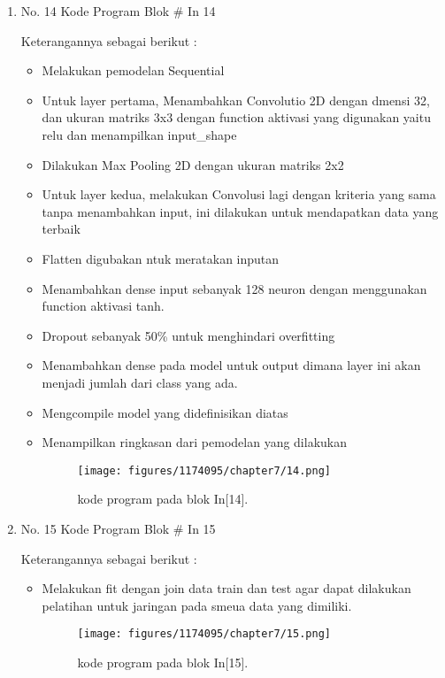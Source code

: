 \begin{enumerate}
\item No. 14 Kode Program Blok \# In 14
\par 
Keterangannya sebagai berikut :
\begin{itemize}
\item Melakukan pemodelan Sequential
\item Untuk layer pertama, Menambahkan Convolutio 2D dengan dmensi 32, dan ukuran matriks 3x3 dengan function aktivasi yang digunakan yaitu relu dan menampilkan input\_shape
\item Dilakukan Max Pooling 2D dengan ukuran matriks 2x2
\item Untuk layer kedua, melakukan Convolusi lagi dengan kriteria yang sama tanpa menambahkan input, ini dilakukan untuk mendapatkan data yang terbaik
\item Flatten digubakan ntuk meratakan inputan
\item Menambahkan dense input sebanyak 128 neuron dengan menggunakan function aktivasi tanh.
\item Dropout sebanyak 50\% untuk menghindari overfitting
\item Menambahkan dense pada model untuk output dimana layer ini akan menjadi jumlah dari class yang ada.
\item Mengcompile model yang didefinisikan diatas
\item Menampilkan ringkasan dari pemodelan yang dilakukan
\begin{figure}[H]
    \texttt{[image: figures/1174095/chapter7/14.png]}
    \centering
    \caption{kode program pada blok  In[14].}
    \end{figure}
\end{itemize}

\item No. 15 Kode Program Blok \# In 15
\par 
Keterangannya sebagai berikut :
\begin{itemize}
\item Melakukan fit dengan join data train dan test agar dapat dilakukan pelatihan untuk jaringan pada smeua data yang dimiliki.
\begin{figure}[H]
    \texttt{[image: figures/1174095/chapter7/15.png]}
    \centering
    \caption{kode program pada blok  In[15].}
    \end{figure}
\end{itemize}


\end{enumerate}
